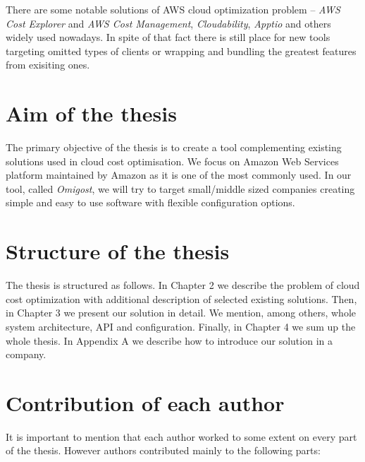 \documentclass[licencjacka,en]{thesisclass}
\begin{document}
    There are some notable solutions of AWS cloud optimization problem -- \textit{AWS Cost Explorer} and \textit{AWS Cost Management}, \textit{Cloudability}, \textit{Apptio} and others widely used nowadays.
    In spite of that fact there is still place for new tools targeting omitted types of clients or wrapping and bundling the greatest features from exisiting ones.

    \section{Aim of the thesis}

    The primary objective of the thesis is to create a tool complementing existing solutions used in cloud cost optimisation.
    We focus on Amazon Web Services platform maintained by Amazon as it is one of the most commonly used.
    In our tool, called \textit{Omigost}, we will try to target small/middle sized companies creating simple and easy to use software with flexible configuration options.

    \section{Structure of the thesis}

    The thesis is structured as follows.
    In Chapter 2 we describe the problem of cloud cost optimization with additional description of selected existing solutions.
    Then, in Chapter 3 we present our solution in detail.
    We mention, among others, whole system architecture, API and configuration.
    Finally, in Chapter 4 we sum up the whole thesis.
    In Appendix A we describe how to introduce our solution in a company.

    \section{Contribution of each author}

    It is important to mention that each author worked to some extent on every part of the thesis.
    However authors contributed mainly to the following parts:
\end{document}
